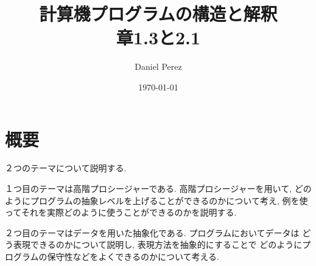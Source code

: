 \documentclass[a4paper,11pt,fleqn]{article}
\author{Daniel Perez}
\date{\today}
\title{
  計算機プログラムの構造と解釈\\
  章1.3と2.1
}
\begin{document}
\maketitle
%
\section*{概要}
２つのテーマについて説明する.

１つ目のテーマは高階プロシージャーである. 高階プロシージャーを用いて,
どのようにプログラムの抽象レベルを上げることができるのかについて考え,
例を使ってそれを実際どのように使うことができるのかを説明する.

２つ目のテーマはデータを用いた抽象化である. プログラムにおいてデータは
どう表現できるのかについて説明し, 表現方法を抽象的にすることで
どのようにプログラムの保守性などをよくできるのかについて考える.
%

%

%
\end{document}
